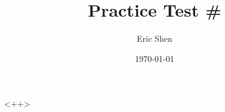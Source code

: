 \documentclass[8pt,ignorenonframetext,xcolor=dvipsnames]{beamer}
\title{Practice Test \#<++>}
\date{\today}
\author{Eric Shen}
\institute{Youth Euclid Association}
\begin{document}
\frame{\titlepage}
<++>
\end{document}
